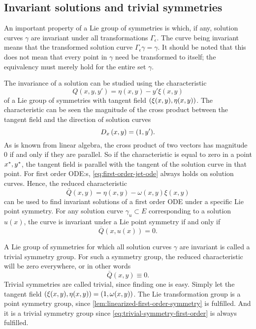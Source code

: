 \subsection{Invariant solutions and trivial symmetries}

An important property of a Lie group of symmetries is which, if any, solution curves \(\gamma\) are invariant under all transformations \(\Gamma_\epsilon\).
The curve being invariant means that the transformed solution curve \(\Gamma_\epsilon\gamma = \gamma\).
It should be noted that this does not mean that every point in \(\gamma\) need be transformed to itself; the equivalency must merely hold for the entire set \(\gamma\).

The invariance of a solution can be studied using the characteristic
\begin{equation}
  Q(x, y, y') = \eta(x, y) - y' \xi(x, y)
\end{equation}
of a Lie group of symmetries with tangent field \(\pqty{\xi(x,y), \eta(x,y)}\).
The characteristic can be seen the magnitude of the cross product between the tangent field and the direction of solution curves
\begin{equation}
  \tD{x} \pqty{x, y} = \pqty{1, y'}.
\end{equation}
As is known from linear algebra, the cross product of two vectors has magnitude 0 if and only if they are parallel.
So if the characteristic is equal to zero in a point \(x^*, y^*\), the tangent field is parallel with the tangent of the solution curve in that point.
For first order ODE:s, \cref{eq:first-order-jet-ode} always holds on solution curves.
Hence, the reduced characteristic
\begin{equation}
  \bar{Q}(x, y) = \eta(x, y) - \omega(x, y) \xi(x, y)
\end{equation}
can be used to find invariant solutions of a first order ODE under a specific Lie point symmetry.
For any solution curve \(\gamma_u \subset E\) corresponding to a solution \(u(x)\), the curve is invariant under a Lie point symmetry if and only if
\begin{equation}
  \bar{Q}(x, u(x)) = 0.
\end{equation}

A Lie group of symmetries for which all solution curves \(\gamma\) are invariant is called a trivial symmetry group.
For such a symmetry group, the reduced characteristic will be zero everywhere, or in other words
\begin{equation} \label{eq:trivial-symmetry-first-order}
  \bar{Q}(x, y) \equiv 0.
\end{equation}
Trivial symmetries are called trivial, since finding one is easy.
Simply let the tangent field \(\pqty{\xi(x,y), \eta(x,y)} = \pqty{1, \omega(x,y)}\).
The Lie transformation group is a point symmetry group, since \cref{lem:linearized-first-order-symmetry} is fulfilled.
And it is a trivial symmetry group since \cref{eq:trivial-symmetry-first-order} is always fulfilled.


